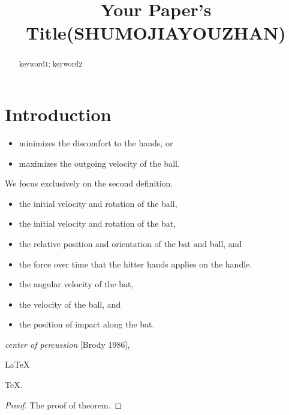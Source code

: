 \documentclass{mcmthesis}
\title{Your Paper's Title(SHUMOJIAYOUZHAN)}
\begin{document}
\begin{abstract}
\lipsum[1]

\begin{keywords}
keyword1; keyword2
\end{keywords}
\end{abstract}
\maketitle
 \tableofcontents
 \newpage



\section{Introduction}
\lipsum[2]
\begin{itemize}
\item minimizes the discomfort to the hands, or 
\item maximizes the outgoing velocity of the ball.
\end{itemize}
We focus exclusively on the second definition.
\begin{itemize}
\item the initial velocity and rotation of the ball,
\item the initial velocity and rotation of the bat,
\item the relative position and orientation of the bat and ball, and
\item the force over time that the hitter hands applies on the handle.
\end{itemize}
\lipsum[3]
\begin{itemize}
\item the angular velocity of the bat,
\item the velocity of the ball, and
\item the position of impact along the bat.
\end{itemize}
\lipsum[4]
\emph{center of percussion} [Brody 1986], \lipsum[5]
\begin{Theorem} \label{thm:latex}
\LaTeX
\end{Theorem}
\begin{Lemma} \label{thm:tex}
\TeX .
\end{Lemma}
\begin{proof}
The proof of theorem.
\end{proof}
\end{document}

